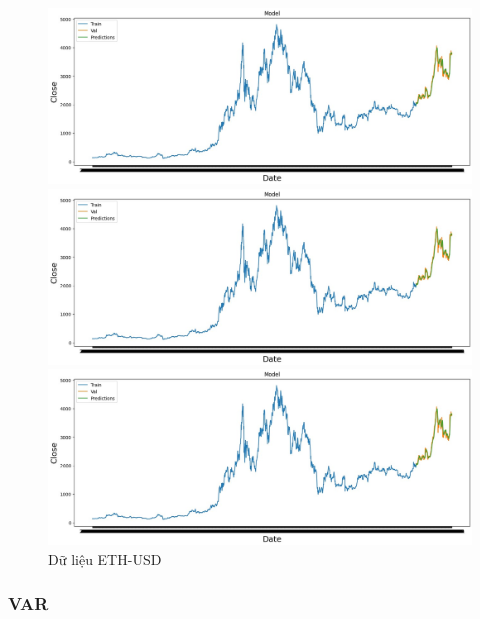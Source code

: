 \documentclass[conference]{IEEEtran}
\begin{document}
	\begin{figure}[H]
		\centering
		\begin{minipage}{0.15\textwidth}
			\centering
			\includegraphics[width=1\textwidth]{Figure/ETH_LSTM.jpg}
		\end{minipage}
		\hfill
		\begin{minipage}{0.15\textwidth}
			\centering
			\includegraphics[width=1\textwidth]{Figure/ETH_LSTM.jpg}
		\end{minipage}
		\hfill
		\begin{minipage}{0.15\textwidth}
			\centering
			\includegraphics[width=1\textwidth]{Figure/ETH_LSTM.jpg}
		\end{minipage}
		\caption{Dữ liệu ETH-USD}
		\label{fig:1}
	\end{figure}
	
	\subsubsection{VAR}
	
\end{document}
